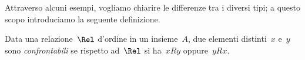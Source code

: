 Attraverso alcuni esempi, vogliamo chiarire le differenze tra i diversi tipi; a 
questo scopo introduciamo la seguente definizione.

\begin{definizione}
Data una relazione~\(\Rel\) d'ordine in un insieme~\(A\), due elementi distinti~\(x\) 
e~\(y\) sono \emph{confrontabili} se rispetto ad~\(\Rel\) si ha~\(x R y\) oppure~\(y R 
x\).
\end{definizione}

\begin{comment}
 
\begin{exrig}
 \begin{esempio}

In base al diagramma di Eulero-Venn nella figura~\ref{fig:B.5} introduciamo 
nell'insieme di insiemi~\(S = \lbrace U, A, B, C, D, E, F \rbrace\) la 
relazione~\(\Rel\): ``essere sottoinsieme di''.

Ricordiamo che, dati due insiemi~\(X\) e~\(Y\), \(X\) è \emph{sottoinsieme} di~\(Y\) 
quando ogni elemento di~\(X\) appartiene a~\(Y\) in simboli~\(X \subseteq Y\) e
si legge~\(X\) è contenuto in~\(Y\) o~\(X\) è uguale a~\(Y\).

Vogliamo studiare le proprietà della relazione~\(\Rel\):

\begin{enumeratea}
\item poiché ogni insieme è sottoinsieme di se stesso, possiamo dire che~\(\Rel\) 
è riflessiva;
\item se~\(X \subseteq Y\) e~\(X \neq Y\) allora~\(Y \not\subset X\) quindi~\(\Rel\) è 
una relazione antisimmetrica;
\item se~\(X \subseteq Y\) e~\(Y \subseteq Z\) allora~\(X \subseteq Z\) quindi~\(\Rel\) 
è una relazione transitiva.
\end{enumeratea}

Inoltre è evidente che esistono almeno due elementi dell'insieme~\(S\) che non 
sono in
alcun modo in relazione: ad esempio~\(A \not\subset D\) e~\(D \not\subset A\), 
ossia~\(A\) e~\(D\) non sono confrontabili.

 \end{esempio}

 \begin{esempio}

Riprendiamo il diagramma di Eulero-Venn dell'esempio precedente e introduciamo 
nell'insieme~\(S = \lbrace U, A, B, C, D, E, F \rbrace\) la relazione~\(\Rel\):
``essere sottoinsieme proprio di''. Studiamo le proprietà di questa relazione:
\begin{itemize*}
 \item cosa è cambiato rispetto alla relazione precedente? \(\ldots\)
 \item sono ancora valide le proprietà antisimmetrica e transitiva? \(\ldots\)
 \item esistono elementi di~\(S\) non confrontabili? \(\ldots\)
\end{itemize*}


\end{comment}
